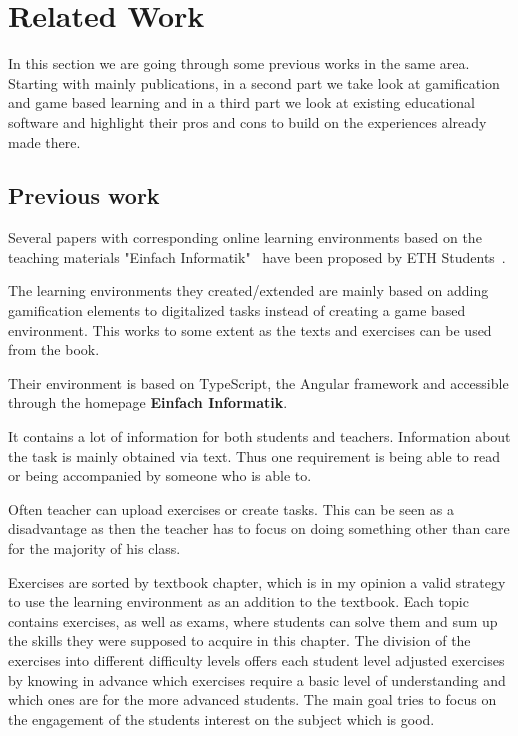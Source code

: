 
\setcounter{chapter}{1}

\chapter{Related Work}\label{ch:relatedwork}
In this section we are going through some previous works in the same area.
Starting with mainly publications, in a second part we take look at gamification
and game based learning and in a third part we look at existing educational software
and highlight their pros and cons to build on the experiences already made there.

\section{Previous work}\label{sec:previous-work}
Several papers with corresponding online learning environments based on the teaching materials "Einfach Informatik"\
\cite{ei56, ei79dat, ei79strat} have been proposed by ETH Students\ \cite{stblum, skamp, tangk, jweber}.

The learning environments they created/extended are mainly based on adding gamification elements to digitalized tasks
instead of creating a game based environment.
This works to some extent as the texts and exercises can be used from the book.

Their environment is based on TypeScript, the Angular framework and accessible through the homepage \textbf{Einfach Informatik}\cite{einfachinformatik}.

It contains a lot of information for both students and teachers.
Information about the task is mainly obtained via text.
Thus one requirement is being able to read or being accompanied by someone who is able to.

Often teacher can upload exercises or create tasks.
This can be seen as a disadvantage as then the teacher has to focus on doing something other than care for the majority
of his class.

Exercises are sorted by textbook chapter, which is in my opinion a valid strategy to use the learning environment as an
addition to the textbook.
Each topic contains exercises, as well as exams, where students can solve
them and sum up the skills they were supposed to acquire in this chapter.
The division of the exercises into different difficulty levels offers each student level adjusted exercises by knowing
in advance which exercises require a basic level of understanding and which ones are for the more advanced students.
The main goal tries to focus on the engagement of the students interest on the subject which is good.

